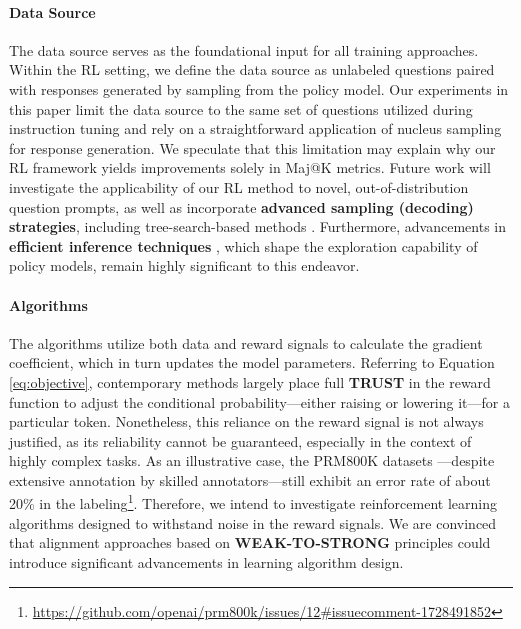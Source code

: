 \begin{itemize}[topsep=0pt]
\begin{itemize}[topsep=0pt]
\paragraph{Data Source} The data source serves as the foundational input for all training approaches. Within the RL setting, we define the data source as unlabeled questions paired with responses generated by sampling from the policy model. Our experiments in this paper limit the data source to the same set of questions utilized during instruction tuning and rely on a straightforward application of nucleus sampling for response generation. We speculate that this limitation may explain why our RL framework yields improvements solely in Maj@K metrics. Future work will investigate the applicability of our RL method to novel, out-of-distribution question prompts, as well as incorporate \textbf{advanced sampling (decoding) strategies}, including tree-search-based methods \citep{yao2023tree}. Furthermore, advancements in \textbf{efficient inference techniques} \citep{xia-etal-2023-speculative,leviathan2023fast,kwon2023efficient,xia2024unlocking}, which shape the exploration capability of policy models, remain highly significant to this endeavor.

\paragraph{Algorithms} The algorithms utilize both data and reward signals to calculate the gradient coefficient, which in turn updates the model parameters. Referring to Equation \ref{eq:objective}, contemporary methods largely place full \textbf{TRUST} in the reward function to adjust the conditional probability—either raising or lowering it—for a particular token. Nonetheless, this reliance on the reward signal is not always justified, as its reliability cannot be guaranteed, especially in the context of highly complex tasks. As an illustrative case, the PRM800K datasets \citep{lightman2023let}—despite extensive annotation by skilled annotators—still exhibit an error rate of about 20\% in the labeling\footnote{\url{https://github.com/openai/prm800k/issues/12\#issuecomment-1728491852}}. Therefore, we intend to investigate reinforcement learning algorithms designed to withstand noise in the reward signals. We are convinced that alignment approaches based on \textbf{WEAK-TO-STRONG} \citep{burns2023weak} principles could introduce significant advancements in learning algorithm design.


\end{itemize}
\end{itemize}
